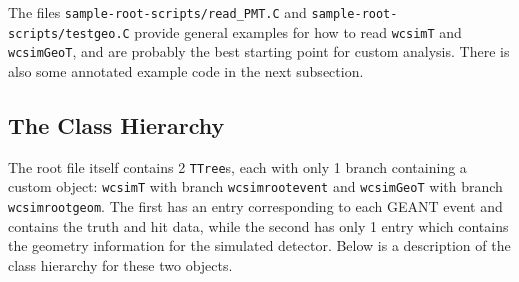 The files \texttt{sample-root-scripts/read\_PMT.C} and \texttt{sample-root-scripts/testgeo.C} provide general examples for how to read \texttt{wcsimT} and \texttt{wcsimGeoT}, and are probably the best starting point for custom analysis.  There is also some annotated example code in the next subsection.


\subsection{The Class Hierarchy}

The root file itself contains 2 \texttt{TTree}s, each with only 1 branch containing a custom object: \texttt{wcsimT} with branch \texttt{wcsimrootevent} and \texttt{wcsimGeoT} with branch \texttt{wcsimrootgeom}.  The first has an entry corresponding to each GEANT event and contains the truth and hit data, while the second has only 1 entry which contains the geometry information for the simulated detector.  Below is a description of the class hierarchy for these two objects.

